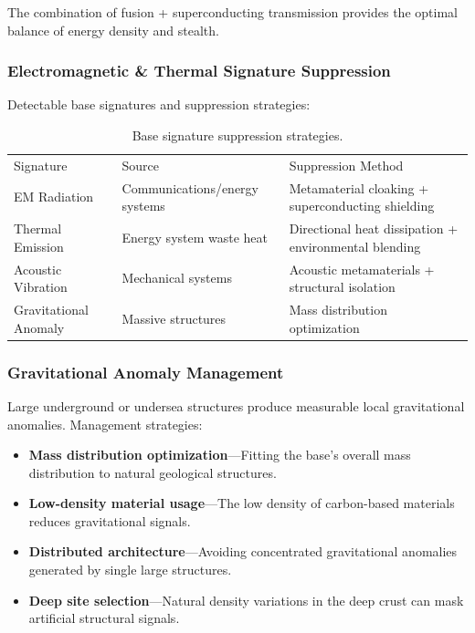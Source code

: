 \documentclass[aps,prd,twocolumn,superscriptaddress,nofootinbib]{revtex4-2}
\begin{document}
The combination of fusion + superconducting transmission provides the optimal balance of energy density and stealth.

\subsubsection{Electromagnetic \& Thermal Signature Suppression}\label{sec:signature-suppression}

Detectable base signatures and suppression strategies:

\begin{table}[htbp]
\caption{Base signature suppression strategies.}
\label{tab:signature-suppression}
\begin{ruledtabular}
\begin{tabular}{lll}
Signature & Source & Suppression Method \\
\colrule
EM Radiation & Communications/energy systems & Metamaterial cloaking + superconducting shielding \\
Thermal Emission & Energy system waste heat & Directional heat dissipation + environmental blending \\
Acoustic Vibration & Mechanical systems & Acoustic metamaterials + structural isolation \\
Gravitational Anomaly & Massive structures & Mass distribution optimization \\
\end{tabular}
\end{ruledtabular}
\end{table}

\subsubsection{Gravitational Anomaly Management}\label{sec:grav-anomaly}

Large underground or undersea structures produce measurable local gravitational anomalies. Management strategies:

\begin{itemize}
  \item \textbf{Mass distribution optimization}---Fitting the base's overall mass distribution to natural geological structures.
  \item \textbf{Low-density material usage}---The low density of carbon-based materials reduces gravitational signals.
  \item \textbf{Distributed architecture}---Avoiding concentrated gravitational anomalies generated by single large structures.
  \item \textbf{Deep site selection}---Natural density variations in the deep crust can mask artificial structural signals.
\end{itemize}
\end{document}
